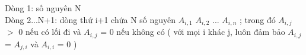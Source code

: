 Dòng 1: số nguyên N   
\\   Dòng 2...N+1: dòng thứ i+1 chứa N số nguyên $A_{i,1}$   $A_{i,2}$   ... $A_{i,n}$   ; trong đó $A_{i,j}$   $>$ 0 nếu có lối đi và $A_{i,j}$   = 0 nếu không có ( với mọi i khác j, luôn đảm bảo $A_{i,j}$   = $A_{j,i}$   và $A_{i,i}$   = 0 )